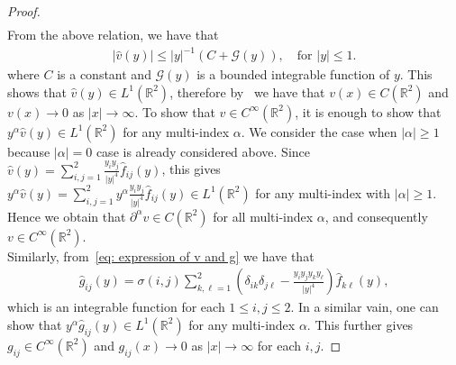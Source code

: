 \documentclass[11pt]{article}
\newcommand{\abs}[1]{\lvert #1 \rvert}
\newcommand{\wh}{\widehat}
\newcommand{\PD}{\partial}
\newcommand*{\Rt}{\mathbb{R}^2}
\newcommand{\qum}[1]{\quad\mbox{#1}}
\begin{document}
\begin{proof}
\begin{align*}
\end{align*}
From the above relation, we have that
 \begin{align*}
 |\widehat{v}(y)| \leq |y|^{-1}\left(C+ \mathcal{G}(y)\right),\qum{for $|y| \leq 1$}.
 \end{align*}
where $C$ is a constant and $\mathcal{G}(y)$ is a bounded integrable function of $y$. This shows that $\wh{v}(y)\in L^1(\Rt)$, therefore by~\cite[Proposition 3.1]{Dorina}  we have that $v(x)\in C(\Rt)$ and $v(x) \rightarrow 0$ as $\abs{x}\rightarrow \infty$.  To show that $v\in C^{\infty} (\Rt)$, it is enough to show that $y^{\alpha} \wh{v}(y)\in L^1(\Rt)$ for any multi-index $\alpha$. We consider the case when $\abs{\alpha}\ge 1$ because $\abs{\alpha}=0$ case is already considered above. Since $\displaystyle  \widehat{v}(y)=  \sum_{i,j=1}^2 \frac{y_{i} y_{j}}{|y|^{4}}\widehat{f}_{i j}(y)$, this gives $\displaystyle y^{\alpha} \wh{v}(y) =  \sum_{i,j=1}^2 y^{\alpha}\frac{y_{i} y_{j}}{|y|^{4}}\widehat{f}_{i j}(y) \in L^1(\Rt) $ for any multi-index with $\abs{\alpha}\ge 1$. Hence we obtain that $\PD^{\alpha} v\in C(\Rt)$ for all multi-index $\alpha$, and consequently $v\in C^{\infty} (\Rt)$.
\vspace{2mm}\\ Similarly, from~\eqref{eq: expression of v and g} we have that 
\begin{align}
   \wh{g}_{ij}(y) 
= \sigma(i,j)\sum_{k,\ell=1}^2\left( \delta_{ik}\delta_{j\ell} - \frac{y_{i} y_{j}y_{k} y_{\ell}}{|y|^{4}}\right)\wh{f}_{k \ell}(y),
\end{align}
which is an integrable function for each $1\le i,j\le 2$. 
In a similar vain, one can show that $ y^{\alpha}\wh{g}_{ij}(y) \in L^1(\Rt) $ for any multi-index $\alpha$. This further gives $g_{ij}\in C^{\infty}(\Rt) $ and $g_{ij}(x) \rightarrow 0$ as $\abs{x}\rightarrow \infty$ for each $i,j$.


\end{proof}
\end{document}
